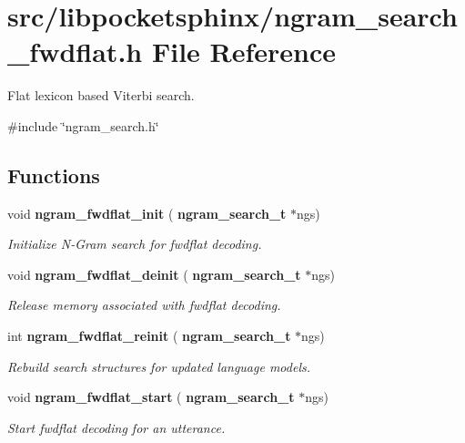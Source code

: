 \section{src/libpocketsphinx/ngram\+\_\+search\+\_\+fwdflat.h File Reference}
\label{ngram__search__fwdflat_8h}


Flat lexicon based Viterbi search.  


{\ttfamily \#include \char`\"{}ngram\+\_\+search.\+h\char`\"{}}\newline
\subsection*{Functions}
\begin{DoxyCompactItemize}
\item 
\mbox{\label{ngram__search__fwdflat_8h_ad4b8ebd904c77f8a28f59cd5ca2c8307}} 
void \textbf{ ngram\+\_\+fwdflat\+\_\+init} (\textbf{ ngram\+\_\+search\+\_\+t} $\ast$ngs)
\begin{DoxyCompactList}\small\item\em Initialize N-\/\+Gram search for fwdflat decoding. \end{DoxyCompactList}\item 
\mbox{\label{ngram__search__fwdflat_8h_a8faf467f90162a7273b23304fc6e8586}} 
void \textbf{ ngram\+\_\+fwdflat\+\_\+deinit} (\textbf{ ngram\+\_\+search\+\_\+t} $\ast$ngs)
\begin{DoxyCompactList}\small\item\em Release memory associated with fwdflat decoding. \end{DoxyCompactList}\item 
\mbox{\label{ngram__search__fwdflat_8h_aa4879c06ddbc455a6f355084a9c574b4}} 
int \textbf{ ngram\+\_\+fwdflat\+\_\+reinit} (\textbf{ ngram\+\_\+search\+\_\+t} $\ast$ngs)
\begin{DoxyCompactList}\small\item\em Rebuild search structures for updated language models. \end{DoxyCompactList}\item 
\mbox{\label{ngram__search__fwdflat_8h_a763c2c7aaa5d7f9c5107af73552a2149}} 
void \textbf{ ngram\+\_\+fwdflat\+\_\+start} (\textbf{ ngram\+\_\+search\+\_\+t} $\ast$ngs)
\begin{DoxyCompactList}\small\item\em Start fwdflat decoding for an utterance. \end{DoxyCompactList}\item 

\end{DoxyCompactItemize}
